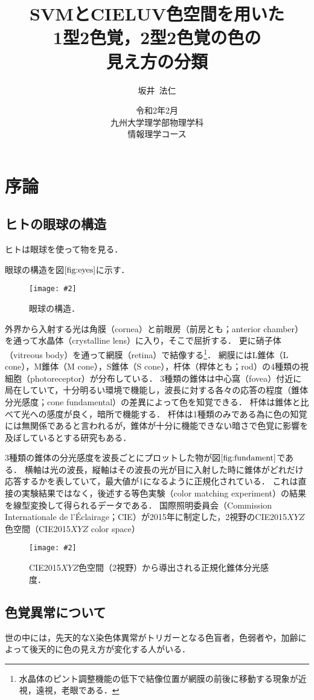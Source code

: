 \documentclass[uplatex,paper=a4,fontsize=4.0truemm,jafontsize=4.0truemm,head_space=30.0truemm,foot_space=30.0truemm,baselineskip=8.0truemm,line_length=40zw,gutter=25.0truemm,oneside,openany,fleqn,hanging_panctuation,open_bracket_pos=nibu_tentsuki,dvipdfmx,jis2004,book,titlepage]{jlreq}
\title{\vspace{-25truemm}\Huge{SVMとCIELUV色空間を用いた\\1型2色覚，2型2色覚の色の\\見え方の分類}\vspace{55truemm}}
\author{\huge{坂井~法仁}}
\date{\LARGE{令和2年2月}\\ \vspace{30truemm}\LARGE{九州大学理学部物理学科\\ 情報理学コース}}
\theoremstyle{mystyle}
\newcommand{\captiondot}[1]{\caption{#1．}}
\newcommand{\figureinput}[4]{\begin{figure}[tbp]\centering\texttt{[image: \#2]}\captiondot{#3}\label{fig:#4}\end{figure}}
\newcommand{\mathdisplaystyle}[1]{\(\displaystyle{#1}\)}
\newcommand{\Reference}[1]{\mathdisplaystyle{\ref{#1}}}
\begin{document}
	\maketitle
	\tableofcontents
	\clearpage
	\setcounter{page}{1}
	\chapter{序論}\label{chap:intro}
		\section{ヒトの眼球の構造}
			ヒトは眼球を使って物を見る．

			眼球の構造を図\Reference{fig:eyes}に示す．
			\figureinput{width=9.5truecm}{D:/a/figs/eye2.png}{眼球の構造\protect\cite[p.~109]{Sotoyama1985}}{eyes}
			外界から入射する光は角膜（cornea）と前眼房（前房とも；anterior chamber）を通って水晶体（crystalline lens）に入り，そこで屈折する．
			更に硝子体（vitreous body）を通って網膜（retina）で結像する\footnote{水晶体のピント調整機能の低下で結像位置が網膜の前後に移動する現象が近視，遠視，老眼である．}．
			網膜にはL錐体（L cone），M錐体（M cone），S錐体（S cone），杆体（桿体とも；rod）の4種類の視細胞（photoreceptor）が分布している．
			3種類の錐体は中心窩（fovea）付近に局在していて，十分明るい環境で機能し，波長に対する各々の応答の程度（錐体分光感度；cone fundamental）の差異によって色を知覚できる．
			杆体は錐体と比べて光への感度が良く，暗所で機能する\cite{Hosoki2014}．
			杆体は1種類のみである為に色の知覚には無関係であると言われるが，錐体が十分に機能できない暗さで色覚に影響を及ぼしているとする研究もある\cite{Takeshita2014}．

			3種類の錐体の分光感度を波長ごとにプロットした物が図\Reference{fig:fundament}である．
			横軸は光の波長，縦軸はその波長の光が目に入射した時に錐体がどれだけ応答するかを表していて，最大値が1になるように正規化されている．
			これは直接の実験結果ではなく，後述する等色実験（color matching experiment）の結果を線型変換して得られるデータである．
			国際照明委員会（Commission Internationale de l'Éclairage；CIE）が2015年に制定した，2\textdegree 視野のCIE2015\mathdisplaystyle{XYZ}色空間（CIE2015\mathdisplaystyle{XYZ} color space）
			\figureinput{width=\linewidth}{D:/a/figs/ConeFundamental.png}{CIE2015\mathdisplaystyle{XYZ}色空間（2\textdegree 視野）から導出される正規化錐体分光感度}{fundament}
		\section{色覚異常について}
			世の中には，先天的なX染色体異常がトリガーとなる色盲者\cite{Okabe2002a}，色弱者\cite{Sunaga2017}や，加齢によって後天的に色の見え方が変化する人\cite{Kuriki2000}がいる．
\end{document}
